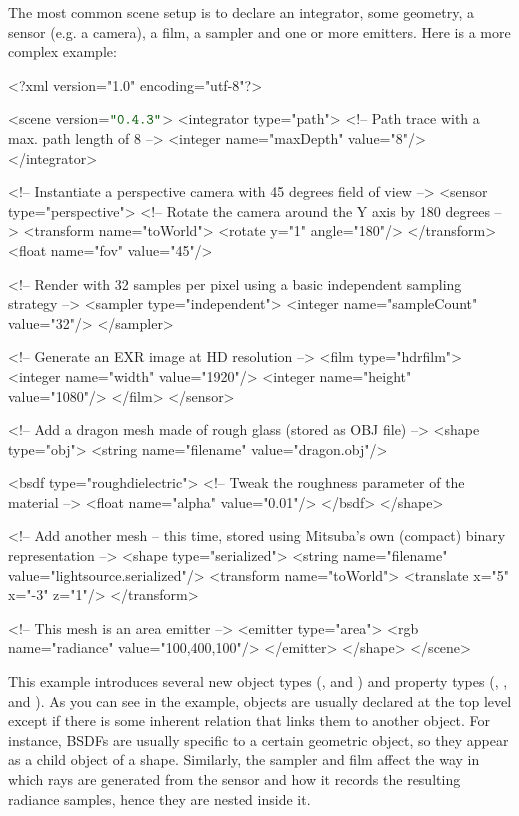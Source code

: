 The most common scene setup is to declare an integrator, some geometry, a sensor (e.g. a camera), a film, a sampler
and one or more emitters. Here is a more complex example:
\begin{xml}
<?xml version="1.0" encoding="utf-8"?>

<scene version=$\MtsVer$>
	<integrator type="path">
		<!-- Path trace with a max. path length of 8 -->
		<integer name="maxDepth" value="8"/>
	</integrator>

	<!-- Instantiate a perspective camera with 45 degrees field of view -->
	<sensor type="perspective">
		<!-- Rotate the camera around the Y axis by 180 degrees -->
		<transform name="toWorld">
			<rotate y="1" angle="180"/>
		</transform>
		<float name="fov" value="45"/>

		<!-- Render with 32 samples per pixel using a basic
             independent sampling strategy -->
		<sampler type="independent">
			<integer name="sampleCount" value="32"/>
		</sampler>

		<!-- Generate an EXR image at HD resolution -->
		<film type="hdrfilm">
			<integer name="width" value="1920"/>
			<integer name="height" value="1080"/>
		</film>
	</sensor>

	<!-- Add a dragon mesh made of rough glass (stored as OBJ file) -->
	<shape type="obj">
		<string name="filename" value="dragon.obj"/>

		<bsdf type="roughdielectric">
			<!-- Tweak the roughness parameter of the material -->
			<float name="alpha" value="0.01"/>
		</bsdf>
	</shape>

	<!-- Add another mesh -- this time, stored using Mitsuba's own
	     (compact) binary representation -->
	<shape type="serialized">
		<string name="filename" value="lightsource.serialized"/>
		<transform name="toWorld">
			<translate x="5" x="-3" z="1"/>
		</transform>

		<!-- This mesh is an area emitter -->
		<emitter type="area">
			<rgb name="radiance" value="100,400,100"/>
		</emitter>
	</shape>
</scene>
\end{xml}
This example introduces several new object types (, and )
and property types (, , and ).
As you can see in the example, objects are usually declared at the top level except if there is some
inherent relation that links them to another object. For instance, BSDFs are usually specific to a certain geometric object, so
they appear as a child object of a shape. Similarly, the sampler and film affect the way in which
rays are generated from the sensor and how it records the resulting radiance samples, hence they are nested inside it.

